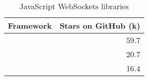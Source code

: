 \begin{table}[ht]
\centering
\caption{JavaScript WebSockets libraries}
\label{tab:githubWebSockets}
\begin{tabular}[t]{|l|r|}
\toprule
Framework & Stars on GitHub (k)\\
\midrule
\cite{githubSocketIO} & 59.7\\
\cite{githubWs} & 20.7\\
\cite{githubUWebSockets} & 16.4\\
\bottomrule
\end{tabular}
\end{table}
